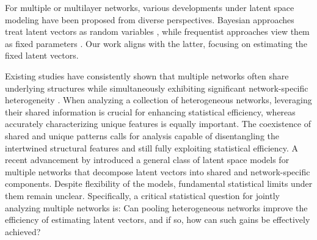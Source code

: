 \documentclass[12pt]{article}
\begin{document}
For multiple or multilayer networks, various developments under latent space modeling have been proposed  from diverse perspectives. 
Bayesian approaches treat latent vectors as random variables  
\citep{hoff2011hierarchical,salter2017latent}, 
while frequentist approaches view them as fixed parameters   
\citep{arroyo2021inference,jones2020multilayer,nielsen2018multiple,zheng2022limit,zhang2020flexible,macdonald2022latent}. 
Our work aligns with the latter, focusing on  estimating the fixed latent vectors.


Existing studies have consistently  shown that
multiple networks   often share  underlying structures  while simultaneously exhibiting significant network-specific heterogeneity 
\citep{wang2019common,zhang2020flexible,arroyo2021inference,chen2022global,he2023semiparametric,macdonald2022latent,lei2022bias}. 
When analyzing a collection of heterogeneous networks, 
 leveraging their shared information is crucial for enhancing statistical  efficiency,
  whereas accurately characterizing unique features is equally important. 
 The  coexistence of shared and unique patterns calls for analysis capable of disentangling the intertwined  structural features and still fully exploiting statistical efficiency.  
A recent advancement by \cite{macdonald2022latent}  introduced  
a general class of  latent space models  for  multiple networks that decompose  latent vectors into shared and network-specific components.  
Despite flexibility of the models,  fundamental statistical limits under them remain unclear. 
Specifically, 
a critical statistical question 
for jointly analyzing  multiple networks
is: Can pooling heterogeneous networks  improve the efficiency of estimating latent vectors, 
and if so, how can such gains be effectively achieved? 
\end{document}
